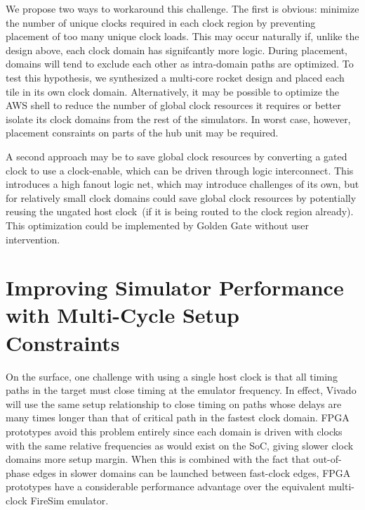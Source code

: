 We propose two ways to workaround this challenge. The first is obvious:
minimize the number of unique clocks required in each clock region by
preventing placement of too many unique clock loads.  This may occur naturally
if, unlike the design above, each clock domain has signifcantly more logic.
During placement, domains will tend to exclude each other as intra-domain paths
are optimized. To test this hypothesis, we synthesized a
multi-core rocket design and placed each tile in its own clock domain.
Alternatively, it may be possible to optimize the AWS shell to reduce the
number of global clock resources it requires or better isolate its clock
domains from the rest of the simulators.  In worst case, however, placement
consraints on parts of the hub unit may be required.

A second approach may be to save global clock resources by converting a gated
clock to use a clock-enable, which can be driven through logic interconnect.
This introduces a high fanout logic net, which may introduce challenges of its
own, but for relatively small clock domains could save global clock resources
by potentially reusing the ungated host clock~(if it is being routed to the
clock region already). This optimization could be implemented by Golden Gate
without user intervention.

\section{Improving Simulator Performance with Multi-Cycle Setup Constraints}

On the surface, one challenge with using a single host clock is that all timing
paths in the target must close timing at the emulator frequency.
In effect, Vivado will use the same setup relationship to close timing on paths
whose delays are many times longer than that of critical path in the fastest
clock domain. FPGA prototypes avoid this problem entirely since each
domain is driven with clocks with the same relative frequencies as would exist on the SoC, giving slower clock domains
more setup margin. When this is combined with the fact that out-of-phase
edges in slower domains can be launched between fast-clock edges, FPGA
prototypes have a considerable performance advantage over the equivalent
multi-clock FireSim emulator.

